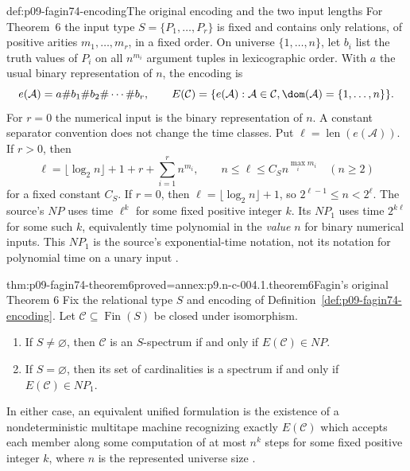 \begin{hbdefinition}{def:p09-fagin74-encoding}{The original encoding and the two input lengths}
For Theorem~6 the input type \(S=\{P_1,\ldots,P_r\}\) is fixed and
contains only relations, of positive arities \(m_1,\ldots,m_r\), in a fixed
order.  On universe \(\{1,\ldots,n\}\), let \(b_i\) list the truth values
of \(P_i\) on all \(n^{m_i}\) argument tuples in lexicographic order.
With \(a\) the usual binary representation of \(n\), the encoding is
\[
 e(\mathcal A)=a\#b_1\#b_2\#\cdots\#b_r,
 \qquad
 E(\mathcal C)=\{e(\mathcal A):\mathcal A\in\mathcal C,
                             \dom(\mathcal A)=\{1,\ldots,n\}\}.
\]
For \(r=0\) the numerical input is the binary representation of \(n\).
A constant separator convention does not change the time classes.
Put \(\ell=\operatorname{len}(e(\mathcal A))\).  If \(r>0\), then
\[
 \ell=\lfloor\log_2n\rfloor+1+r+\sum_{i=1}^{r}n^{m_i},
 \qquad n\leq\ell\leq C_S n^{\max_i m_i}\quad(n\geq2)
\]
for a fixed constant \(C_S\).  If \(r=0\), then
\(\ell=\lfloor\log_2n\rfloor+1\), so
\(2^{\ell-1}\leq n<2^\ell\).
The source's \(NP\) uses time \(\ell^k\) for some fixed positive integer
\(k\).  Its \(NP_1\) uses time \(2^{k\ell}\) for some such \(k\),
equivalently time polynomial in the \emph{value} \(n\) for binary numerical
inputs.  This \(NP_1\) is the source's exponential-time notation, not its
notation for polynomial time on a unary input
\cite[\S3, p.~51; \S4, pp.~52--53]{Fagin1974}.
\end{hbdefinition}

\begin{hbtheorem}{thm:p09-fagin74-theorem6}{proved=annex:p9.n-c-004.1.theorem6}{Fagin's original Theorem 6}
Fix the relational type \(S\) and encoding of
Definition~\ref{def:p09-fagin74-encoding}.  Let
\(\mathcal C\subseteq\operatorname{Fin}(S)\) be closed under isomorphism.
\begin{enumerate}
 \item If \(S\ne\varnothing\), then \(\mathcal C\) is an
       \(S\)-spectrum if and only if \(E(\mathcal C)\in NP\).
 \item If \(S=\varnothing\), then its set of cardinalities is a spectrum
       if and only if \(E(\mathcal C)\in NP_1\).
\end{enumerate}
In either case, an equivalent unified formulation is the existence of a
nondeterministic multitape machine recognizing exactly \(E(\mathcal C)\)
which accepts each member along some computation of at most \(n^k\) steps
for some fixed positive integer \(k\), where \(n\) is the represented universe size
\cite[Theorem~6 and its note, p.~53]{Fagin1974}.
\end{hbtheorem}

